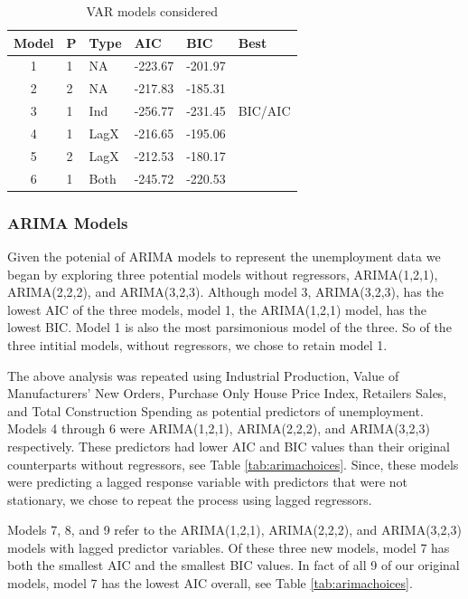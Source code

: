 \documentclass[twoside,twocolumn]{article}
\begin{document}
\begin{table}[ht]
\centering

\caption{VAR models considered}
\label{tab:varchoices}
\begin{tabular}{clllll}
  \hline
 Model & P & Type &  AIC & BIC & Best \\ 
  \hline
1  & 1 & NA  &  -223.67 & -201.97 &  \\ 
  2  & 2 & NA  &   -217.83 & -185.31 &  \\ 
  3  & 1 & Ind  & -256.77 & -231.45 & BIC/AIC \\ 
  4  & 1 & LagX & -216.65 & -195.06 &  \\ 
  5  & 2 & LagX & -212.53 & -180.17 &  \\ 
  6  & 1 & Both  & -245.72 & -220.53 &  \\ 
   \hline
\end{tabular}
\end{table}

\subsubsection{ARIMA Models}

Given the potenial of ARIMA models to represent the unemployment data we began by exploring three potential models without regressors, ARIMA(1,2,1), ARIMA(2,2,2), and ARIMA(3,2,3). Although model 3, ARIMA(3,2,3), has the lowest AIC of the three models, model 1, the ARIMA(1,2,1) model, has the lowest BIC. Model 1 is also the most parsimonious model of the three. So of the three intitial models, without regressors, we chose to retain model 1.  

The above analysis was repeated using Industrial Production, Value of Manufacturers' New Orders, Purchase Only House Price Index,  Retailers Sales, and Total Construction Spending as potential predictors of unemployment. Models 4 through 6 were ARIMA(1,2,1), ARIMA(2,2,2), and ARIMA(3,2,3) respectively.  These predictors had lower AIC and BIC values than their original counterparts without regressors, see Table \ref{tab:arimachoices}. Since, these models were predicting a lagged response variable with predictors that were not stationary, we chose to repeat the process using lagged regressors.

Models 7, 8, and 9 refer to the ARIMA(1,2,1), ARIMA(2,2,2), and ARIMA(3,2,3) models with lagged predictor variables.  Of these three new models, model 7 has both the smallest AIC and the smallest BIC values. In fact of all 9 of our original models, model 7 has the lowest AIC overall, see Table \ref{tab:arimachoices}.  
     
\end{document}
